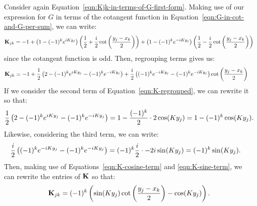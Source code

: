 Consider again Equation~\ref{eqn:Kjk-in-terms-of-G-first-form}. Making
use of our expression for $G$ in terms of the cotangent function in
Equation~\ref{eqn:G-in-cot-and-G-per-sum}, we can write:
\begin{align*}
  \bold{K}_{jk} = -1 + \left(1 - (-1)^ke^{iKy_j}\right) \left({1 \over 2} + {i \over 2}\cot\left(y_j - x_k \over 2\right)\right) + \left(1 - (-1)^ke^{-iKy_j}\right) \left({1 \over 2} - {i \over 2} \cot \left(y_j - x_k \over 2\right)\right)
\end{align*}
since the cotangent function is odd. Then, regrouping terms gives us:
\begin{align} \label{eqn:K-regrouped}
  \bold{K}_{jk} &= -1 + {1 \over 2} \left(2 - (-1)^ke^{iKy_j} - (-1)^ke^{-iKy_j}\right) + {i \over 2} \left((-1)^ke^{-iKy_j} - (-1)^ke^{-iKy_j}\right) \cot \left(y_j - x_k \over 2\right)
\end{align}
If we consider the second term of Equation~\ref{eqn:K-regrouped}, we
can rewrite it so that:
\begin{align} \label{eqn:K-cosine-term}
  {1 \over 2} \left(2 - (-1)^ke^{iKy_j} - (-1)^ke^{-iKy_j}\right) = 1 - {(-1)^k \over 2} \cdot 2 \cos(Ky_j) = 1 - (-1)^k \cos(Ky_j).
\end{align}
Likewise, considering the third term, we can write:
\begin{align} \label{eqn:K-sine-term}
  {i \over 2} \left((-1)^ke^{-iKy_j} - (-1)^ke^{-iKy_j}\right)
  &= (-1)^k {i \over 2} \cdot -2i \sin(Ky_j) = (-1)^k \sin(Ky_j).
\end{align}
Then, making use of Equations~\ref{eqn:K-cosine-term} and
\ref{eqn:K-sine-term}, we can rewrite the entries of $\bold{K}$ so
that:
\begin{align} \label{eqn:K-entries-final}
  \bold{K}_{jk} = (-1)^k \left(\sin(Ky_j) \cot \left(y_j - x_k \over 2\right) - \cos(Ky_j)\right).
\end{align}

